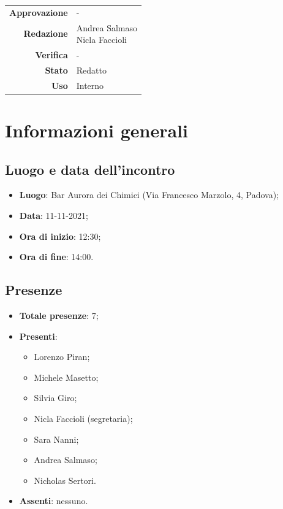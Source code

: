 \documentclass[11pt]{article}
\begin{document}
\begin{titlepage}
\begin{center}
			\large
			\begin{tabular}{r|l}
				\textbf{Approvazione} &  -\\
				\textbf{Redazione} &  \parbox[t]{5cm}{Andrea Salmaso \\Nicla Faccioli}\\
				\textbf{Verifica} &  -\\
				\textbf{Stato} & Redatto \\
				\textbf{Uso} & Interno
			\end{tabular}
			\vfill
			
		\end{center}
	\end{titlepage}
	
	\section{Informazioni generali}
	\subsection{Luogo e data dell'incontro}
	\begin{itemize}
		\item \textbf{Luogo}: Bar Aurora dei Chimici (Via Francesco Marzolo, 4, Padova);
		\item \textbf{Data}: 11-11-2021;
		\item \textbf{Ora di inizio}: 12:30;
		\item \textbf{Ora di fine}: 14:00.
	\end{itemize}
	
	\subsection{Presenze}
	\begin{itemize}
		\item \textbf{Totale presenze}: 7;
		\item \textbf{Presenti}:
		\begin{itemize}
			\item Lorenzo Piran; 
			\item Michele Masetto;
			\item Silvia Giro;
			\item Nicla Faccioli (segretaria);
			\item Sara Nanni;
			\item Andrea Salmaso;
			\item Nicholas Sertori.
		\end{itemize}
		\item \textbf{Assenti}: nessuno.
	\end{itemize}
\end{document}
